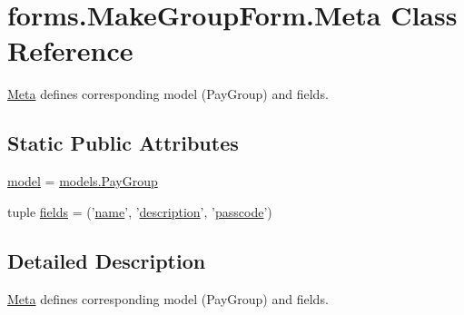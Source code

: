 \hypertarget{classforms_1_1_make_group_form_1_1_meta}{\section{forms.\-Make\-Group\-Form.\-Meta Class Reference}
\label{classforms_1_1_make_group_form_1_1_meta}
}


\hyperlink{classforms_1_1_make_group_form_1_1_meta}{Meta} defines corresponding model (Pay\-Group) and fields.  


\subsection*{Static Public Attributes}
\begin{DoxyCompactItemize}
\item 
\hyperlink{classforms_1_1_make_group_form_1_1_meta_ac29614b76d655e69c45c88b40a21c16e}{model} = \hyperlink{classmodels_1_1_pay_group}{models.\-Pay\-Group}
\item 
tuple \hyperlink{classforms_1_1_make_group_form_1_1_meta_ae92fd41d182c3c9b6bb23221993839f5}{fields} = ('\hyperlink{classforms_1_1_make_group_form_a4d1a913bfafa1caf65dc8b658d94f2e3}{name}', '\hyperlink{classforms_1_1_make_group_form_ad2aa4425d86ae17e396cd0dd26aead15}{description}', '\hyperlink{classforms_1_1_make_group_form_a918fb02b6cb1b6e39e538ee27b42d155}{passcode}')
\end{DoxyCompactItemize}


\subsection{Detailed Description}
\hyperlink{classforms_1_1_make_group_form_1_1_meta}{Meta} defines corresponding model (Pay\-Group) and fields. 

